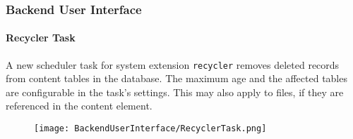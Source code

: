 \begin{frame}[fragile]
	\frametitle{Backend User Interface}
	\framesubtitle{Recycler Task}

	A new scheduler task for system extension \texttt{recycler} removes deleted
	records from content tables in the database. The maximum age and the affected
	tables are configurable in the task's settings.
	\newline
	This may also apply to files, if they are referenced in the content element.

	\begin{figure}
		\texttt{[image: BackendUserInterface/RecyclerTask.png]}
	\end{figure}

\end{frame}

